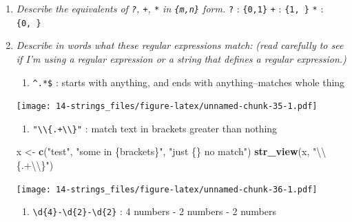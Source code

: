 \documentclass[]{book}
\newenvironment{Shaded}{\begin{snugshade}}{\end{snugshade}}
\newcommand{\CharTok}[1]{\textcolor[rgb]{0.31,0.60,0.02}{#1}}
\newcommand{\KeywordTok}[1]{\textcolor[rgb]{0.13,0.29,0.53}{\textbf{#1}}}
\newcommand{\NormalTok}[1]{#1}
\newcommand{\StringTok}[1]{\textcolor[rgb]{0.31,0.60,0.02}{#1}}
\providecommand{\tightlist}{%
  \setlength{\itemsep}{0pt}\setlength{\parskip}{0pt}}
\theoremstyle{definition}
\theoremstyle{definition}
\theoremstyle{definition}
\theoremstyle{remark}
\begin{document}
\begin{enumerate}
\def\labelenumi{\arabic{enumi}.}
\item
  \emph{Describe the equivalents of \texttt{?}, \texttt{+}, \texttt{*}
  in \texttt{\{m,n\}} form.} \texttt{?} : \texttt{\{0,1\}} \texttt{+} :
  \texttt{\{1,\ \}} \texttt{*} : \texttt{\{0,\ \}}
\item
  \emph{Describe in words what these regular expressions match:}
  \emph{(read carefully to see if I'm using a regular expression or a
  string} \emph{that defines a regular expression.)}

  \begin{enumerate}
  \def\labelenumii{\arabic{enumii}.}
  \tightlist
  \item
    \texttt{\^{}.*\$} : starts with anything, and ends with
    anything--matches whole thing
  \end{enumerate}

\begin{Shaded}
\end{Shaded}

  \texttt{[image: 14-strings\_files/figure-latex/unnamed-chunk-35-1.pdf]}

  \begin{enumerate}
  \def\labelenumii{\arabic{enumii}.}
  \setcounter{enumii}{1}
  \tightlist
  \item
    \texttt{"\textbackslash{}\textbackslash{}\{.+\textbackslash{}\textbackslash{}\}"}
    : match text in brackets greater than nothing
  \end{enumerate}

\begin{Shaded}
\begin{Highlighting}[]
\NormalTok{x <-}\StringTok{ }\KeywordTok{c}\NormalTok{(}\StringTok{"test"}\NormalTok{, }\StringTok{"some in \{brackets\}"}\NormalTok{, }\StringTok{"just \{\} no match"}\NormalTok{)}
\KeywordTok{str_view}\NormalTok{(x, }\StringTok{"}\CharTok{\textbackslash{}\textbackslash{}}\StringTok{\{.+}\CharTok{\textbackslash{}\textbackslash{}}\StringTok{\}"}\NormalTok{)}
\end{Highlighting}
\end{Shaded}

  \texttt{[image: 14-strings\_files/figure-latex/unnamed-chunk-36-1.pdf]}

  \begin{enumerate}
  \def\labelenumii{\arabic{enumii}.}
  \setcounter{enumii}{2}
  \tightlist
  \item
    \texttt{\textbackslash{}d\{4\}-\textbackslash{}d\{2\}-\textbackslash{}d\{2\}}
    : 4 numbers - 2 numbers - 2 numbers
  \end{enumerate}


\end{enumerate}
\end{document}
